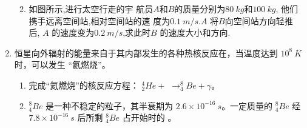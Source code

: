 \begin{enumerate}
\begin{enumerate}


\item 
如图所示,进行太空行走的宇
航员$ A $和$ B $的质量分别为$ 80 \ kg $和$ 100 \ kg $,
他们携手远离空间站,相对空间站的速
度为$ 0.1 \ m /s.A $ 将$ B $向空间站方向轻推
后, $ A $ 的速度变为$ 0.2 \ m /s $,求此时$ B $ 的速度大小和方向.
\begin{figure}[h!]
	\flushright
\begin{subfigure}{0.4\linewidth}
	\centering
	 
	\caption{}\label{}
\end{subfigure}
\begin{subfigure}{0.4\linewidth}
	\centering
	 
	\caption{}\label{}
\end{subfigure}
\end{figure}

	

\end{enumerate}




\item 
{}
恒星向外辐射的能量来自于其内部发生的各种热核反应在，当温度达到 $ 10^{8} \ K $ 时，可以发生
“氦燃烧”。
\begin{enumerate}
	\item
完成“氦燃烧”的核反应方程： $ ^{4}_{2}He+ $  \underlinegap  $ \rightarrow ^{8}_{4}Be+ \gamma $。



\item 
$ ^{8}_{4}Be $ 是一种不稳定的粒子，其半衰期为 $ 2.6 \times 10^{-16} \ s $。一定质量的 $ ^{8}_{4}Be $ 经 $ 7.8 \times 10^{-16} \ s $ 后所剩 $ ^{8}_{4}Be $
占开始时的 \underlinegap 。
\end{enumerate}






\end{enumerate}
